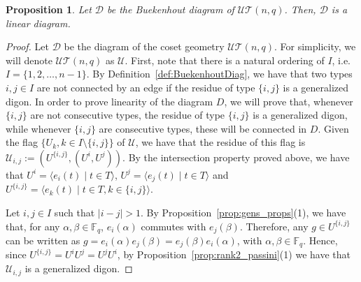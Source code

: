 \documentclass[11pt,letterpaper]{amsart}
\newtheorem{proposition}[theorem]{Proposition}
\newcommand{\TT}{\mathcal{T}}
\newcommand{\DD}{\mathcal{D}}
\newcommand{\FF}{\mathbb{F}}
\newcommand{\UU}{\mathcal{U}}
\begin{document}
\begin{proposition}\label{prop:UTnq_lin_diag}
    Let $\DD$ be the Buekenhout diagram of $\UU\TT(n,q)$. Then, $\DD$ is a linear diagram.
\end{proposition}
\begin{proof}
Let $\DD$ be the diagram of the coset geometry $\UU\TT(n,q)$. For simplicity, we will denote $\UU\TT(n,q)$ as $\UU$. 
First, note that there is a natural ordering of $I$, i.e. $I= \{1,2,\ldots,n-1\}$.
By Definition~\ref{def:BuekenhoutDiag}, we have that two types $i,j\in I$ are not connected by an edge if the residue of type $\{i,j\}$ is a generalized digon. In order to prove linearity of the diagram $D$, we will prove that, whenever $\{i,j\}$ are not consecutive types, the residue of type $\{i,j\}$ is a generalized digon, while whenever $\{i,j\}$ are consecutive types, these will be connected in $D$. Given the flag $\{U_k, k\in I\setminus\{i,j\}\}$ of $\UU$, we have that the residue of this flag is $\UU_{i,j} :=(U^{\{i,j\}},(U^i,U^j))$. By the intersection property proved above, we have that $U^i=\langle e_{i}(t)\mid t\in T\rangle$, $U^j=\langle e_{j}(t)\mid t\in T\rangle$ and $U^{\{i,j\}}=\langle e_{k}(t)\mid t\in T, k\in\{i,j\}\rangle$.

Let $i,j\in I$ such that $|i-j|>1$.  
By Proposition~\ref{prop:gens_props}(1), we have that, for any $\alpha,\beta\in \FF_q$, $e_{i}(\alpha)$ commutes with $e_{j}(\beta)$. Therefore, any $g\in U^{\{i,j\}}$ can be written as $g=e_{i}(\alpha)e_j(\beta)=e_j(\beta)e_{i}(\alpha)$, with $\alpha,\beta\in \FF_q$. Hence, since $U^{\{i,j\}} = U^i U^j=U^j U^i$, by Proposition~\ref{prop:rank2_passini}(1) we have that $\UU_{i,j}$ is a generalized digon.


\end{proof}
\end{document}
